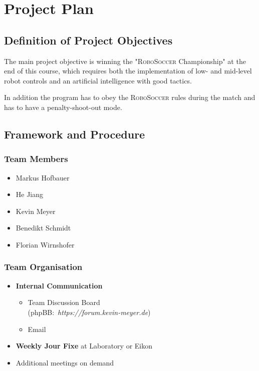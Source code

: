 \documentclass[12pt]{article}
\begin{document}
\section{Project Plan}
\subsection{Definition of Project Objectives}
The main project objective is winning the "\textsc{RoboSoccer} Championship" at the end of this course,
which requires both the implementation of low- and mid-level robot controls and an artificial intelligence with good tactics.

In addition the program has to obey the \textsc{RoboSoccer} rules during the match and has to have a penalty-shoot-out mode.

\subsection{Framework and Procedure}


\subsubsection*{Team Members}
\begin{itemize}
	\item Markus Hofbauer
	\item He Jiang
	\item Kevin Meyer
	\item Benedikt Schmidt
	\item Florian Wirnshofer
\end{itemize}

\subsubsection*{Team Organisation}
\begin{itemize}
	\item \textbf{Internal Communication}
	\begin{itemize}
		\item Team Discussion Board \\\mbox{(phpBB: \textit{https://forum.kevin-meyer.de})}
		\item Email
	\end{itemize}
	\item \textbf{Weekly Jour Fixe} at Laboratory or Eikon
	\item Additional meetings on demand
\end{itemize}
\end{document}

